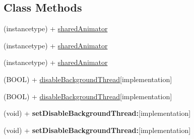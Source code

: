 \subsection*{Class Methods}
\begin{DoxyCompactItemize}
\item 
(instancetype) + \mbox{\hyperlink{interface_p_o_p_animator_ad9ba487d9bd5cdedfe429ddb76ffb6aa}{shared\+Animator}}
\item 
(instancetype) + \mbox{\hyperlink{interface_p_o_p_animator_aa6768f7ad741d8a92b72795700529783}{shared\+Animator}}
\item 
(instancetype) + \mbox{\hyperlink{interface_p_o_p_animator_aa6768f7ad741d8a92b72795700529783}{shared\+Animator}}
\item 
(B\+O\+OL) + \mbox{\hyperlink{interface_p_o_p_animator_a4c3d7e7c7d6bef1865ae24f49c69615b}{disable\+Background\+Thread}}{\ttfamily  \mbox{[}implementation\mbox{]}}
\item 
(B\+O\+OL) + \mbox{\hyperlink{interface_p_o_p_animator_a4c3d7e7c7d6bef1865ae24f49c69615b}{disable\+Background\+Thread}}{\ttfamily  \mbox{[}implementation\mbox{]}}
\item 
\mbox{\label{interface_p_o_p_animator_a92bc54de74748ad384ea88f2a0bf6090}} 
(void) + {\bfseries set\+Disable\+Background\+Thread\+:}{\ttfamily  \mbox{[}implementation\mbox{]}}
\item 
\mbox{\label{interface_p_o_p_animator_a92bc54de74748ad384ea88f2a0bf6090}} 
(void) + {\bfseries set\+Disable\+Background\+Thread\+:}{\ttfamily  \mbox{[}implementation\mbox{]}}
\end{DoxyCompactItemize}
